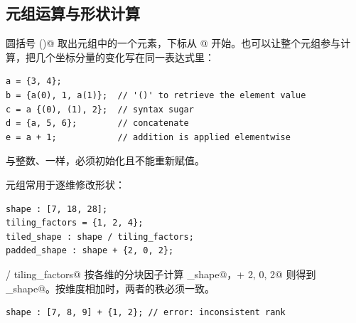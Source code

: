 \subsection*{元组运算与形状计算}

圆括号 \co@()@ 取出元组中的一个元素，下标从 @ 开始。也可以让整个元组参与计算，把几个坐标分量的变化写在同一表达式里：

\begin{lstlisting}[language=croqtile,caption={赋一个新元组}]
a = {3, 4};
b = {a(0), 1, a(1)};  // '()' to retrieve the element value
c = a {(0), (1), 2};  // syntax sugar
d = {a, 5, 6};        // concatenate
e = a + 1;            // addition is applied elementwise
\end{lstlisting}

\co@ituple@ 与整数、\co@mdspan@ 一样，必须初始化且不能重新赋值。

元组常用于逐维修改形状：

\begin{lstlisting}[language=croqtile,caption={用 i-tuple 索引 mdspan}]
shape : [7, 18, 28];
tiling_factors = {1, 2, 4};
tiled_shape : shape / tiling_factors;
padded_shape : shape + {2, 0, 2};
\end{lstlisting}

\co@shape / tiling_factors@ 按各维的分块因子计算 \co@tiled_shape@，\co@shape + {2, 0, 2}@ 则得到 \co@padded_shape@。按维度相加时，两者的秩必须一致。

\begin{lstlisting}[language=croqtile,caption={非法的形状表达式}]
shape : [7, 8, 9] + {1, 2}; // error: inconsistent rank
\end{lstlisting}
